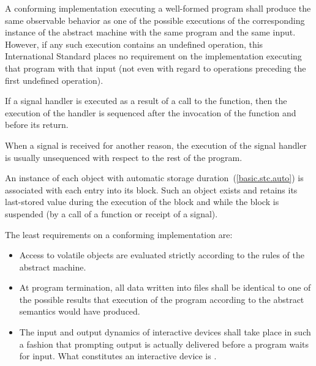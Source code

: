 %
%
\pnum
A conforming implementation executing a well-formed program shall
produce the same observable behavior as one of the possible executions
of the corresponding instance of the abstract machine with the
same program and the same input. However, if any such execution contains an undefined operation, this International Standard places no
requirement on the implementation executing that program with that input
(not even with regard to operations preceding the first undefined
operation).

%
%
%
%
\pnum
If a signal handler is executed as a result of a call to the 
function, then the execution of the handler is sequenced after the invocation
of the  function and before its return.
\begin{note} When a signal is received for another reason, the execution of the
signal handler is usually unsequenced with respect to the rest of the program.
\end{note}

\pnum
An instance of each object with automatic storage
duration~(\ref{basic.stc.auto}) is associated with each entry into its
block. Such an object exists and retains its last-stored value during
the execution of the block and while the block is suspended (by a call
of a function or receipt of a signal).

\pnum
The least requirements on a conforming implementation are:

\begin{itemize}

\item
Access to volatile objects are evaluated strictly according to the
rules of the abstract machine.

\item
At program termination, all data written into files shall be
identical to one of the possible results that execution of the program
according to the abstract semantics would have produced.

\item
The input and output dynamics of interactive devices shall take
place in such a fashion that prompting output is actually delivered before a program waits for input. What constitutes an interactive device is
.

\end{itemize}

